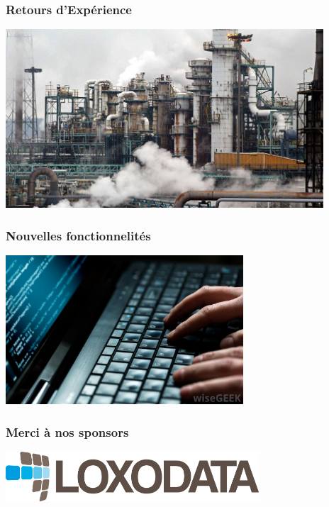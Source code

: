\documentclass{beamer}
\begin{document}
\begin{frame}[fragile]
  \frametitle{Retours d'Expérience}

  
  \begin{center}
    \includegraphics[height=18em]{indus.jpg}
  \end{center}
\end{frame}

\begin{frame}[fragile]
  \frametitle{Nouvelles fonctionnelités}

  
  \begin{center}
    \includegraphics[height=15em]{fingers-on-a-keyboard.jpg}
  \end{center}
\end{frame}

\begin{frame}[fragile]
  \frametitle{Merci à nos sponsors}

  \begin{center}
    \includegraphics[height=5em]{loxologo.png}
  \end{center}
\end{frame}
\end{document}
